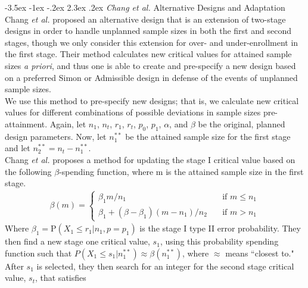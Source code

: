 \documentclass[12pt]{report}\usepackage[]{graphicx}\usepackage[]{color}
\makeatletter
\newlength{\li}\setlength{\li}{14.48pt}
\newlength{\di}\setlength{\di}{-3.5mm}
\renewcommand\section{ \@startsection {section}{1}{\z@}%
                                   {-3.5ex \@plus -1ex \@minus -.2ex}%
                                   {2.3ex \@plus.2ex}%
                                   {\centering\large\fontfamily{qcs}\selectfont}}
\makeatother
\begin{document}
\section{\textit{Chang et al.} Alternative Designs and Adaptation}
Chang \textit{et al.} \cite{Chang} proposed an alternative design that is an extension of two-stage designs in order to handle unplanned sample sizes in both the first and second stages, though we only consider this extension for over- and under-enrollment in the first stage. Their method calculates new critical values for attained sample sizes \textit{a priori}, and thus one is able to create and pre-specify a new design based on a preferred Simon or Admissible design in defense of the events of unplanned sample sizes.\\
\indent We use this method to pre-specify new designs; that is, we calculate new critical values for different combinations of possible deviations in sample sizes pre-attainment. Again, let $n_1$, $n_t$, $r_1$, $r_t$, $p_0$, $p_1$, $\alpha$, and $\beta$ be the original, planned design parameters. Now, let $n_1^{\ast \ast}$ be the attained sample size for the first stage and let $n_2^{\ast\ast} = n_t - n_1^{\ast\ast}$. \\
\indent Chang \textit{et al.} proposes a method for updating the stage I critical value based on the following $\beta$-spending function, where m is the attained sample size in the first stage.
\begin{equation}
\begin{aligned}
\beta(m) = \left\{
        \begin{array}{ll}
            \beta_1 m/n_1 & \quad \text{if } m\leq n_1 \\
            \beta_1 + (\beta - \beta_1)(m - n_1)/n_2 & \quad \text{if } m > n_1
        \end{array}
    \right.
\end{aligned}
\end{equation}
Where $\beta_1 = \mbox{P}(X_1 \leq r_1 \vert n_1, p = p_1)$ is the stage I type II error probability.
They then find a new stage one critical value, $s_1$, using this probability spending function such that $P(X_1 \leq s_1 | n_1^{\ast\ast}) \approx \beta(n_1^{\ast\ast})$, where $\approx$ means ``closest to." After $s_1$ is selected, they then search for an integer for the second stage critical value, $s_t$, that satisfies
\end{document}
